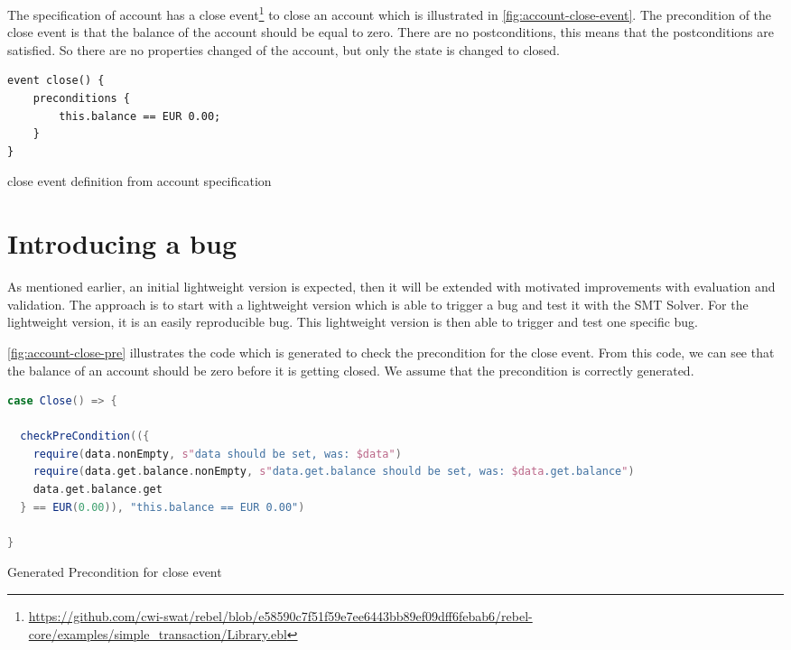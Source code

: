 The specification of account has a close event\footnote{\url{https://github.com/cwi-swat/rebel/blob/e58590c7f51f59e7ee6443bb89ef09dff6febab6/rebel-core/examples/simple_transaction/Library.ebl}}
to close an account which is illustrated in \autoref{fig:account-close-event}.
The precondition of the close event is that the balance of the account should be
equal to zero. There are no postconditions, this means that the postconditions
are satisfied. So there are no properties changed of the account, but only the state
is changed to closed.

\begin{sourcecode}[h!]
\begin{lstlisting}[]
event close() {
	preconditions {
		this.balance == EUR 0.00;
	}
}
\end{lstlisting}
\caption{close event definition from account specification}\label{fig:account-close-event}
\end{sourcecode}

\section{Introducing a bug}

As mentioned earlier, an initial lightweight version is expected, then it will be extended with motivated improvements with evaluation and validation. The approach is to start with a lightweight version which is able to trigger a bug and test it with the SMT Solver. For the lightweight version, it is an easily reproducible bug. This lightweight version is then able to trigger and test one specific bug.

\autoref{fig:account-close-pre} illustrates the code which is generated to check the precondition for the close event. From this code, we can see that the balance of an account should be zero before it is getting closed. We assume that the precondition is correctly generated.

\begin{sourcecode}[h!]
\begin{lstlisting}[language=scala]
case Close() => {

  checkPreCondition(({
    require(data.nonEmpty, s"data should be set, was: $data")
    require(data.get.balance.nonEmpty, s"data.get.balance should be set, was: $data.get.balance")
    data.get.balance.get
  } == EUR(0.00)), "this.balance == EUR 0.00")

}
\end{lstlisting}
\caption{Generated Precondition for close event}\label{fig:account-close-pre}
\end{sourcecode}


